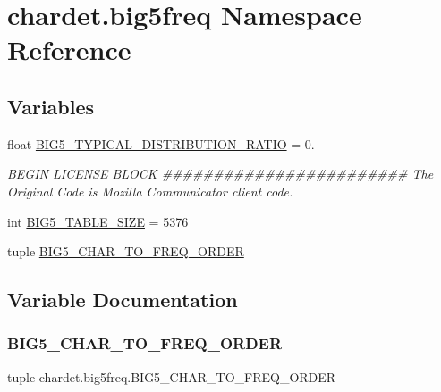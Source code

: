 \hypertarget{namespacechardet_1_1big5freq}{}\section{chardet.\+big5freq Namespace Reference}
\label{namespacechardet_1_1big5freq}
\subsection*{Variables}
\begin{DoxyCompactItemize}
\item 
float \hyperlink{namespacechardet_1_1big5freq_a5b9317a9f401350cd7b9a995974f6921}{B\+I\+G5\+\_\+\+T\+Y\+P\+I\+C\+A\+L\+\_\+\+D\+I\+S\+T\+R\+I\+B\+U\+T\+I\+O\+N\+\_\+\+R\+A\+T\+IO} = 0.
\begin{DoxyCompactList}\small\item\em B\+E\+G\+IN L\+I\+C\+E\+N\+SE B\+L\+O\+CK \#\#\#\#\#\#\#\#\#\#\#\#\#\#\#\#\#\#\#\#\#\#\#\# The Original Code is Mozilla Communicator client code. \end{DoxyCompactList}\item 
int \hyperlink{namespacechardet_1_1big5freq_a47232451e4e49681291711b60c4dce37}{B\+I\+G5\+\_\+\+T\+A\+B\+L\+E\+\_\+\+S\+I\+ZE} = 5376
\item 
tuple \hyperlink{namespacechardet_1_1big5freq_a98688e648726b208844acd30f5656256}{B\+I\+G5\+\_\+\+C\+H\+A\+R\+\_\+\+T\+O\+\_\+\+F\+R\+E\+Q\+\_\+\+O\+R\+D\+ER}
\end{DoxyCompactItemize}


\subsection{Variable Documentation}
\mbox{\label{namespacechardet_1_1big5freq_a98688e648726b208844acd30f5656256}} 
\subsubsection{\texorpdfstring{B\+I\+G5\+\_\+\+C\+H\+A\+R\+\_\+\+T\+O\+\_\+\+F\+R\+E\+Q\+\_\+\+O\+R\+D\+ER}{BIG5\_CHAR\_TO\_FREQ\_ORDER}}
{\footnotesize\ttfamily tuple chardet.\+big5freq.\+B\+I\+G5\+\_\+\+C\+H\+A\+R\+\_\+\+T\+O\+\_\+\+F\+R\+E\+Q\+\_\+\+O\+R\+D\+ER}

